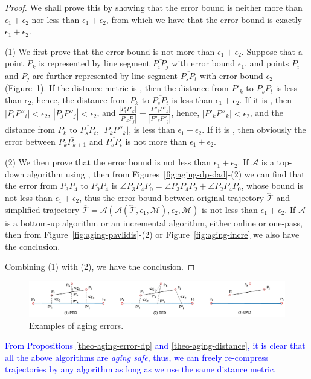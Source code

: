 \begin{proof} 	We shall prove this by showing that the error bound is neither more than $\epsilon_1+ \epsilon_2$  nor less than $\epsilon_1+ \epsilon_2$,
from which we have that the error bound is exactly $\epsilon_1+ \epsilon_2$.

	(1) We first prove that the error bound is not more than $\epsilon_1+ \epsilon_2$. Suppose that a point $P_k$ is represented by line segment $\overline{P_iP_j}$ with error bound $\epsilon_1$, and points $P_i$ and $P_j$ are further represented by line segment $\overline{P_sP_t}$ with error bound $\epsilon_2$ (Figure~\ref{fig:aging-error}).
	If the distance metric is \ped, then the distance from $P'_k$ to $\overline{P_sP_t}$ is less than $\epsilon_2$, hence, the distance from $P_k$ to $\overline{P_sP_t}$ is less than $\epsilon_1 + \epsilon_2$.
	If it is \sed, then $|P_iP''_i|<\epsilon_2$, $|P_jP''_j|<\epsilon_2$, and $\frac{|P_iP'_k|}{|P'_kP_j|} = \frac{|P''_iP''_k|}{|P''_kP''_j|}$, hence, $|P'_kP''_k|<\epsilon_2$, and the distance from $P_k$ to $\overline{P_sP_t}$, \ie $|P_kP''_k|$, is less than $\epsilon_1 + \epsilon_2$.
	If it is \dad, then obviously the error between $\overline{P_kP_{k+1}}$ and $\overline{P_sP_t}$ is not more than $\epsilon_1+ \epsilon_2$.
	
	(2) We then prove that the  error bound is not less than $\epsilon_1+ \epsilon_2$.
	If $\mathcal{A}$ is a top-down algorithm using \dad, then from Figures~\ref{fig:aging-dp-dad}-(2) we can find that the error from $\overline{P_3P_4}$ to $\overline{P_0P_4}$ is $\angle{P_3P_4P_0} = \angle{P_3P_4P_2} + \angle{P_2P_4P_0}$, whose bound is not less than $\epsilon_1 + \epsilon_2$, thus the error bound between original trajectory $\dddot{\mathcal{T}}$ and simplified trajectory $\overline{\mathcal{T}}=\mathcal{A}(\mathcal{A}(\dddot{\mathcal{T}}, \epsilon_1, \mathcal{M}), \epsilon_2, \mathcal{M})$ is not less than $\epsilon_1+ \epsilon_2$.
	If $\mathcal{A}$ is a bottom-up algorithm or an incremental algorithm, either online or one-pass, then from Figure~\ref{fig:aging-pavlidis}-(2) or Figure~\ref{fig:aging-incre} we also have the conclusion.
	
	
	Combining (1) with (2), we have the conclusion.
\end{proof}

\begin{figure}[tb!]
	\centering
	\includegraphics[scale=0.6]{Figures/Fig-aging-error.jpg}
	
	\caption{\small Examples of aging errors.}
	\vspace{-2ex}
	\label{fig:aging-error}
\end{figure}

\textcolor{blue}{From Propositions \ref{theo-aging-error-dp} and \ref{theo-aging-distance}, it is clear that all the above algorithms are  \emph{aging safe}, thus, {we can freely re-compress trajectories by any algorithm as long as we use the same distance metric.}}